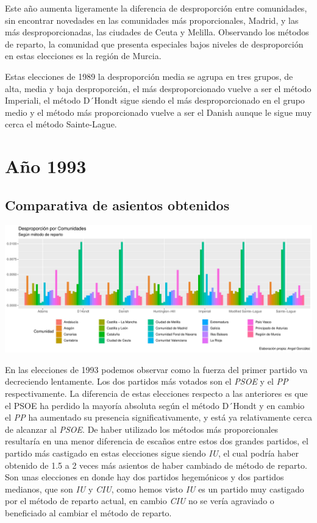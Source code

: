 \documentclass[12pt,a4paper,]{book}
\numberwithin{dummy}{section}
\theoremstyle{ocrenumbox}
\theoremstyle{blacknumex}
\theoremstyle{blacknumbox}
\theoremstyle{ocrenum}
\theoremstyle{ocrenum}
\begin{document}
Este año aumenta ligeramente la diferencia de desproporción entre
comunidades, sin encontrar novedades en las comunidades más
proporcionales, Madrid, y las más desproporcionadas, las ciudades de
Ceuta y Melilla. Observando los métodos de reparto, la comunidad que
presenta especiales bajos niveles de desproporción en estas elecciones
es la región de Murcia.

Estas elecciones de 1989 la desproporción media se agrupa en tres
grupos, de alta, media y baja desproporción, el más desproporcionado
vuelve a ser el método Imperiali, el método D´Hondt sigue siendo el más
desproporcionado en el grupo medio y el método más proporcionado vuelve
a ser el Danish aunque le sigue muy cerca el método Sainte-Lague.

\hypertarget{auxf1o-1993}{%
\section{Año 1993}\label{auxf1o-1993}}

\hypertarget{comparativa-de-asientos-obtenidos-5}{%
\subsection{Comparativa de asientos
obtenidos}\label{comparativa-de-asientos-obtenidos-5}}

\begin{center}\includegraphics[width=1\linewidth]{figurasR/unnamed-chunk-93-1} \end{center}

En las elecciones de 1993 podemos observar como la fuerza del primer
partido va decreciendo lentamente. Los dos partidos más votados son el
\emph{PSOE} y el \emph{PP} respectivamente. La diferencia de estas
elecciones respecto a las anteriores es que el PSOE ha perdido la
mayoría absoluta según el método D´Hondt y en cambio el \emph{PP} ha
aumentado su presencia significativamente, y está ya relativamente cerca
de alcanzar al \emph{PSOE}. De haber utilizado los métodos más
proporcionales resultaría en una menor diferencia de escaños entre estos
dos grandes partidos, el partido más castigado en estas elecciones sigue
siendo \emph{IU}, el cual podría haber obtenido de 1.5 a 2 veces más
asientos de haber cambiado de método de reparto. Son unas elecciones en
donde hay dos partidos hegemónicos y dos partidos medianos, que son
\emph{IU} y \emph{CIU}, como hemos visto \emph{IU} es un partido muy
castigado por el método de reparto actual, en cambio \emph{CIU} no se
vería agraviado o beneficiado al cambiar el método de reparto.
\end{document}
